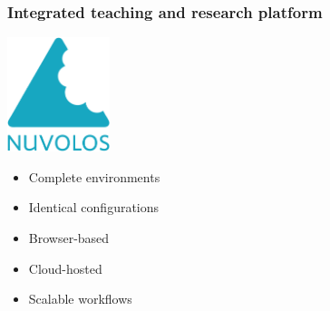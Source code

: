\begin{frame}\frametitle{Integrated teaching and research platform}\vspace{1.25cm}

	\begin{multicols}{2}

	\hspace{1.3cm}\includegraphics[width=0.225\textwidth]{material/crop-nuvolos}


	\begin{itemize}\setlength\itemsep{1em}
		\item Complete environments
		\item Identical configurations
		\item Browser-based
		\item Cloud-hosted
		\item Scalable workflows
  \end{itemize}
  	  \end{multicols}

\end{frame}
